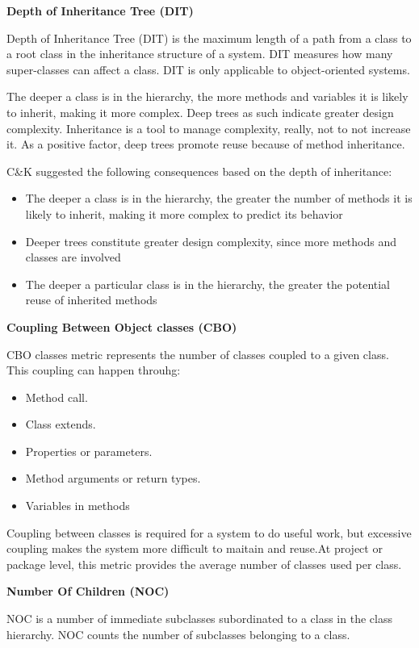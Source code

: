 \textbf{Depth of Inheritance Tree (DIT)}

Depth of Inheritance Tree (DIT) is the maximum length of a path from a class to a root class in the inheritance structure of a system. DIT measures how many super-classes can affect a class. DIT is only applicable to object-oriented systems.

The deeper a class is in the hierarchy, the more methods and variables it is likely to inherit, making it more complex. Deep trees as such indicate greater design complexity. Inheritance is a tool to manage complexity, really, not to not increase it. As a positive factor, deep trees promote reuse because of method inheritance.

C\&K suggested the following consequences based on the depth of inheritance:
\begin{itemize}
	\item The deeper a class is in the hierarchy, the greater the number of methods it is likely to inherit, making it more complex to predict its behavior
	\item Deeper trees constitute greater design complexity, since more methods and classes are involved
	\item The deeper a particular class is in the hierarchy, the greater the potential reuse of inherited methods 
\end{itemize}

\textbf{Coupling Between Object classes (CBO)}

CBO classes metric represents the number of classes coupled to a given class. This coupling can happen throuhg:
\begin{itemize}
	\item Method call. 
	\item Class extends.
	\item Properties or parameters. 
	\item Method arguments or return types.
	\item Variables in methods
\end{itemize}

Coupling between classes is required for a system to do useful work, but excessive coupling makes the system more difficult to maitain and reuse.At project or package level, this metric provides the average number of classes used per class.

\textbf{Number Of Children (NOC)}

NOC is a number of immediate subclasses subordinated to a class in the class hierarchy. NOC counts the number of subclasses belonging to a class.

